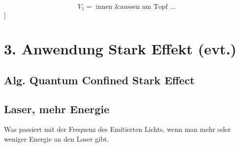\begin{refsection}
\[
  V_1 = \text{ innen \& aussen am Topf ... }
\]
]

\section{ 3. Anwendung Stark Effekt (evt.) }

\subsection{ Alg. Quantum Confined Stark Effect }

\subsection{ Laser, mehr Energie }
Was passiert mit der Frequenz des Emitierten Lichts, wenn man mehr oder weniger Energie an den Laser gibt.

\printbibliography[heading=subbibliography]
\end{refsection}
